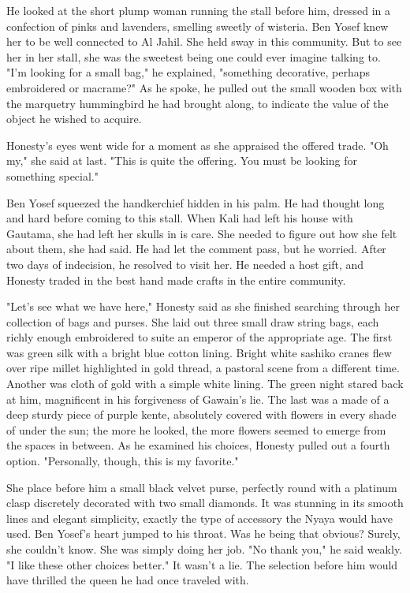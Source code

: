 \documentclass{amsart}
\begin{document}
He looked at the short plump woman running the stall before him, dressed in a confection of pinks and lavenders, smelling sweetly of wisteria. Ben Yosef knew her to be well connected to Al Jahil. She held sway in this community. But to see her in her stall, she was the sweetest being one could ever imagine talking to. "I'm looking for a small bag," he explained, "something decorative, perhaps embroidered or macrame?" As he spoke, he pulled out the small wooden box with the marquetry hummingbird he had brought along, to indicate the value of the object he wished to acquire.

Honesty's eyes went wide for a moment as she appraised the offered trade. "Oh my," she said at last. "This is quite the offering. You must be looking for something special." 

Ben Yosef squeezed the handkerchief hidden in his palm. He had thought long and hard before coming to this stall. When Kali had left his house with Gautama, she had left her skulls in is care. She needed to figure out how she felt about them, she had said. He had let the comment pass, but he worried. After two days of indecision, he resolved to visit her. He needed a host gift, and Honesty traded in the best hand made crafts in the entire community.

"Let's see what we have here," Honesty said as she finished searching through her collection of bags and purses. She laid out three small draw string bags, each richly enough embroidered to suite an emperor of the appropriate age. The first was green silk with a bright blue cotton lining. Bright white sashiko cranes flew over ripe millet highlighted in gold thread, a pastoral scene from a different time. Another was cloth of gold with a simple white lining. The green night stared back at him, magnificent in his forgiveness of Gawain's lie. The last was a made of a deep sturdy piece of purple kente, absolutely covered with flowers in every shade of under the sun; the more he looked, the more flowers seemed to emerge from the spaces in between. As he examined his choices, Honesty pulled out a fourth option. "Personally, though, this is my favorite." 

She place before him a small black velvet purse, perfectly round with a platinum clasp discretely decorated with two small diamonds. It was stunning in its smooth lines and elegant simplicity, exactly the type of accessory the Nyaya would have used. Ben Yosef's heart jumped to his throat. Was he being that obvious? Surely, she couldn't know. She was simply doing her job. "No thank you," he said weakly. "I like these other choices better." It wasn't a lie. The selection before him would have thrilled the queen he had once traveled with.
\end{document}
